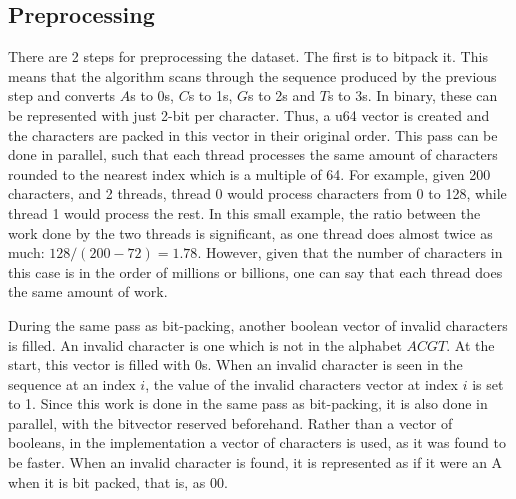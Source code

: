 \begin{table}[]
\centering
\caption{Benchmarking results of kseq++ vs kseq++\_REad when parsing FASTA and FASTQ files in both zipped and unzipped formats. These values are averaged over 5 runs.}\label{tab:KlibVsReklib}
\end{table}

\subsection{Preprocessing}

There are 2 steps for preprocessing the dataset.
The first is to bitpack it.
This means that the algorithm scans through the sequence produced by the previous step and converts $A$s to 0s, $C$s to 1s, $G$s to 2s and $T$s to 3s.
In binary, these can be represented with just 2-bit per character.
Thus, a u64 vector is created and the characters are packed in this vector in their original order.
This pass can be done in parallel, such that each thread processes the same amount of characters rounded to the nearest index which is a multiple of 64.
For example, given 200 characters, and 2 threads, thread 0 would process characters from 0 to 128, while thread 1 would process the rest.
In this small example, the ratio between the work done by the two threads is significant, as one thread does almost twice as much: $128 / (200 - 72) = 1.78$.
However, given that the number of characters in this case is in the order of millions or billions, one can say that each thread does the same amount of work.

During the same pass as bit-packing, another boolean vector of invalid characters is filled.
An invalid character is one which is not in the alphabet $ACGT$.
At the start, this vector is filled with 0s.
When an invalid character is seen in the sequence at an index $i$, the value of the invalid characters vector at index $i$ is set to 1.
Since this work is done in the same pass as bit-packing, it is also done in parallel, with the bitvector reserved beforehand.
Rather than a vector of booleans, in the implementation a vector of characters is used, as it was found to be faster.
When an invalid character is found, it is represented as if it were an A when it is bit packed, that is, as $00$.

